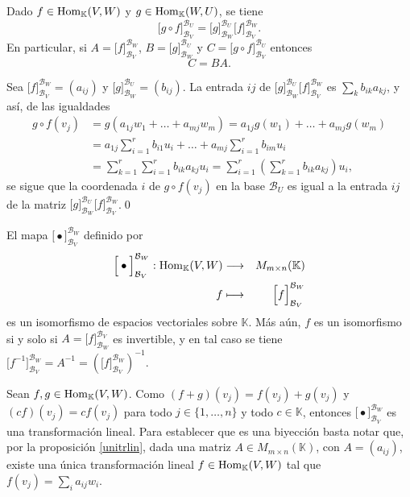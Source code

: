 \begin{prop}\label{compmult}
Dado $f\in\operatorname{Hom}_{\mathbb{K}}(V,W)$ y $g\in\operatorname{Hom}_{\mathbb{K}}(W,U)$, se tiene
$$
\Big[ g\circ f \Big]^{\mathcal{B}_U}_{\mathcal{B}_V}=\Big[ g \Big]^{\mathcal{B}_U}_{\mathcal{B}_W}\Big[ f \Big]^{\mathcal{B}_W}_{\mathcal{B}_V}.
$$
En particular, si $A=\Big[ f \Big]^{\mathcal{B}_W}_{\mathcal{B}_V}$, $B=\Big[ g \Big]^{\mathcal{B}_U}_{\mathcal{B}_W}$ y $C=\Big[ g\circ f \Big]^{\mathcal{B}_U}_{\mathcal{B}_V}$ entonces
$$C=BA.$$
\end{prop}

\dem Sea $\Big[ f \Big]^{\mathcal{B}_W}_{\mathcal{B}_V}=(a_{ij})$ y $\Big[ g \Big]^{\mathcal{B}_U}_{\mathcal{B}_W}=(b_{ij})$.
La entrada $ij$ de $\Big[ g \Big]^{\mathcal{B}_U}_{\mathcal{B}_W}\Big[ f \Big]^{\mathcal{B}_W}_{\mathcal{B}_V}$ es $\sum_k b_{ik}a_{kj}$, y as\'i, de las igualdades
\begin{align*}
g\circ f(v_j) &= g(a_{1j}w_1+\ldots+a_{mj}w_m)=a_{1j}g(w_1)+\ldots+a_{mj}g(w_m)\\
 & = a_{1j}\sum_{i=1}^rb_{i1}u_i+\ldots+a_{mj}\sum_{i=1}^rb_{im}u_i\\
 & = \sum_{k=1}^r\sum_{i=1}^rb_{ik}a_{kj}u_i=\sum_{i=1}^r\left(\sum_{k=1}^r b_{ik}a_{kj}\right)u_i,
\end{align*}
se sigue que la coordenada $i$ de $g\circ f(v_j)$ en la base $\mathcal{B}_U$ es igual a la entrada $ij$ de la matriz $\Big[ g \Big]^{\mathcal{B}_U}_{\mathcal{B}_W}\Big[ f \Big]^{\mathcal{B}_W}_{\mathcal{B}_V}$.\qed

\begin{prop}\label{homym}
El mapa $\Big[ \bullet \Big]^{\mathcal{B}_W}_{\mathcal{B}_V}$ definido por
\begin{eqnarray*}
\Big[ \bullet \Big]^{\mathcal{B}_W}_{\mathcal{B}_V}: \operatorname{Hom}_{\mathbb{K}}(V,W) & \longrightarrow & M_{m\times n}(\mathbb{K})\\
f & \longmapsto & \Big[ f \Big]^{\mathcal{B}_W}_{\mathcal{B}_V}
\end{eqnarray*}
es un isomorfismo de espacios vectoriales sobre $\mathbb{K}$. M\'as a\'un, $f$ es un isomorfismo si y solo si $A=\Big[ f \Big]_{\mathcal{B}_W}^{\mathcal{B}_V}$ es invertible, y en tal caso se tiene $\Big[ f^{-1} \Big]^{\mathcal{B}_W}_{\mathcal{B}_V}=A^{-1}=\left(\Big[ f \Big]_{\mathcal{B}_V}^{\mathcal{B}_W}\right)^{-1}$.
\end{prop}

\dem Sean $f,g\in\operatorname{Hom}_{\mathbb{K}}(V,W)$. Como $(f+g)(v_j)=f(v_j)+g(v_j)$ y $(cf)(v_j)=cf(v_j)$ para todo $j\in\{1,\ldots,n\}$ y todo $c\in \mathbb{K}$, entonces  $\Big[ \bullet \Big]^{\mathcal{B}_W}_{\mathcal{B}_V}$ es una transformaci\'on lineal. Para establecer que es una biyecci\'on basta notar que, por la proposici\'on \ref{unitrlin}, dada una matriz $A\in M_{m\times n}(\mathbb{K})$, con $A=(a_{ij})$, existe una \'unica transformaci\'on lineal $f\in \operatorname{Hom}_{\mathbb{K}}(V,W)$ tal que $f(v_j)=\sum_i a_{ij}w_i$.

